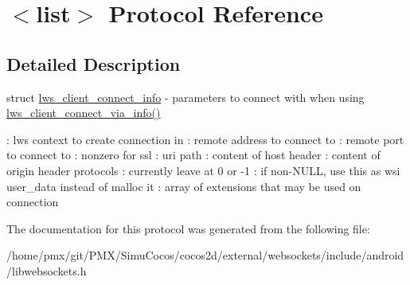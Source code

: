 \hypertarget{protocollist-p}{}\section{$<$list$>$ Protocol Reference}
\label{protocollist-p}


\subsection{Detailed Description}
struct \hyperlink{structlws__client__connect__info}{lws\+\_\+client\+\_\+connect\+\_\+info} -\/ parameters to connect with when using \hyperlink{group__client_ga0c966136905f467816307cfba6deb5fd}{lws\+\_\+client\+\_\+connect\+\_\+via\+\_\+info()}

\+: lws context to create connection in \+: remote address to connect to \+: remote port to connect to \+: nonzero for ssl \+: uri path \+: content of host header \+: content of origin header protocols \+: currently leave at 0 or -\/1 \+: if non-\/\+N\+U\+LL, use this as wsi user\+\_\+data instead of malloc it \+: array of extensions that may be used on connection 

The documentation for this protocol was generated from the following file\+:\begin{DoxyCompactItemize}
\item 
/home/pmx/git/\+P\+M\+X/\+Simu\+Cocos/cocos2d/external/websockets/include/android/libwebsockets.\+h\end{DoxyCompactItemize}
